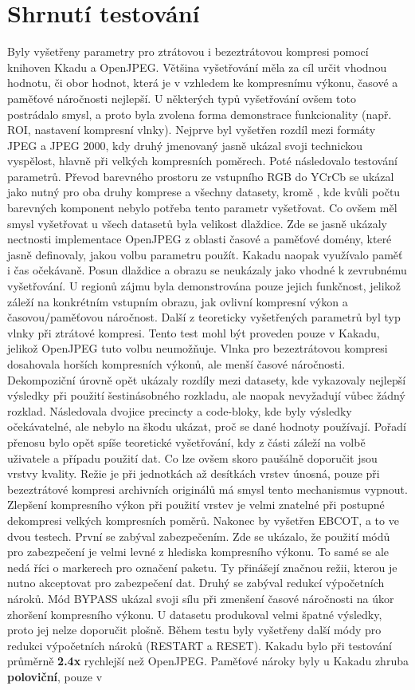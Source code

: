 \section{Shrnutí testování}
Byly vyšetřeny parametry pro ztrátovou i bezeztrátovou kompresi pomocí knihoven Kkadu a OpenJPEG. Většina vyšetřování měla za cíl určit vhodnou hodnotu, či obor hodnot, která je v vzhledem ke kompresnímu výkonu, časové a paměťové náročnosti nejlepší. U některých typů vyšetřování ovšem toto postrádalo smysl, a proto byla zvolena forma demonstrace funkcionality (např. ROI, nastavení kompresní vlnky). Nejprve byl vyšetřen rozdíl mezi formáty JPEG a JPEG 2000, kdy druhý jmenovaný jasně ukázal svoji technickou vyspělost, hlavně při velkých kompresních poměrech. Poté následovalo testování parametrů. Převod barevného prostoru ze vstupního RGB do YCrCb se ukázal jako nutný pro oba druhy komprese a všechny datasety, kromě , kde kvůli počtu barevných komponent nebylo potřeba tento parametr vyšetřovat. Co ovšem měl smysl vyšetřovat u všech datasetů byla velikost dlaždice. Zde se jasně ukázaly nectnosti implementace OpenJPEG z oblasti časové a paměťové domény, které jasně definovaly, jakou volbu parametru použít. Kakadu naopak využívalo paměť i čas očekávaně. Posun dlaždice a obrazu se neukázaly jako vhodné k zevrubnému vyšetřování. U regionů zájmu byla demonstrována pouze jejich funkčnost, jelikož záleží na konkrétním vstupním obrazu, jak ovlivní kompresní výkon a časovou/paměťovou náročnost. Další z teoreticky vyšetřených parametrů byl typ vlnky při ztrátové kompresi. Tento test mohl být proveden pouze v Kakadu, jelikož OpenJPEG tuto volbu neumožňuje. Vlnka pro bezeztrátovou kompresi dosahovala horších kompresních výkonů, ale menší časové náročnosti. Dekompoziční úrovně opět ukázaly rozdíly mezi datasety, kde  vykazovaly nejlepší výsledky při použití šestinásobného rozkladu, ale  naopak nevyžadují vůbec žádný rozklad. Následovala dvojice precincty a code-bloky, kde byly výsledky očekávatelné, ale nebylo na škodu ukázat, proč se dané hodnoty používají. Pořadí přenosu bylo opět spíše teoretické vyšetřování, kdy z části záleží na volbě uživatele a případu použití dat. Co lze ovšem skoro paušálně doporučit jsou vrstvy kvality. Režie je při jednotkách až desítkách vrstev únosná, pouze při bezeztrátové kompresi archivních originálů má smysl tento mechanismus vypnout. Zlepšení kompresního výkon při použití vrstev je velmi znatelné při postupné dekompresi velkých kompresních poměrů. Nakonec by vyšetřen EBCOT, a to ve dvou testech. První se zabýval zabezpečením. Zde se ukázalo, že použití módů pro zabezpečení je velmi levné z hlediska kompresního výkonu. To samé se ale nedá říci o markerech pro označení paketu. Ty přinášejí značnou režii, kterou je nutno akceptovat pro zabezpečení dat. Druhý se zabýval redukcí výpočetních nároků. Mód BYPASS ukázal svoji sílu při zmenšení časové náročnosti na úkor zhoršení kompresního výkonu. U datasetu  produkoval velmi špatné výsledky, proto jej nelze doporučit plošně. Během testu byly vyšetřeny další módy pro redukci výpočetních nároků (RESTART a RESET). Kakadu bylo při testování průměrně \textbf{2.4x} rychlejší než OpenJPEG. Paměťové nároky byly u Kakadu zhruba \textbf{poloviční}, pouze v 